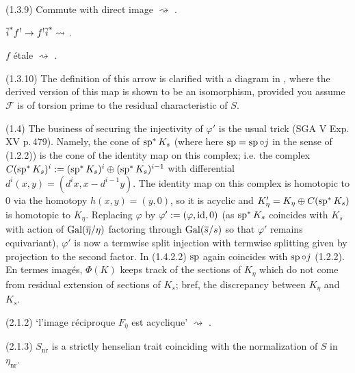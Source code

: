 \documentclass[deligne.tex]{subfiles}
\begin{document}
(1.3.9) Commute with direct image $\rightsquigarrow$
\cite[Exp. XVIII 3.1.12.3]{SGAA}.

$\overline i^*f^!\rightarrow f^!\overline i^*\rightsquigarrow$
\cite[Exp. XVIII 3.1.14.2]{SGAA}.

$f$ étale $\rightsquigarrow$ \cite[Exp. XVIII 3.1.8]{SGAA}.

(1.3.10) The definition of this arrow is clarified with a diagram in
\cite[3.7]{thfin}, where the derived version of this map is shown to be an
isomorphism, provided you assume $\mathcal F$ is of torsion prime to the
residual characteristic of $S$.

(1.4) The business of securing the injectivity of $\varphi'$ is the usual 
trick (SGA V Exp. XV p.\,479). Namely, the cone of $\operatorname{sp}^*K_s$
(where here $\operatorname{sp}=\operatorname{sp}\circ j$ in the sense of (1.2.2))
is the cone of the identity map on this complex; i.e. the complex
$C(\operatorname{sp}^*K_s)^i:=(\operatorname{sp}^*K_s)^i\oplus(\operatorname{sp}^*K_s)^{i-1}$ with differential
$d^i(x,y)=(d^ix,x-d^{i-1}y)$. The identity map on this complex is homotopic
to 0 via the homotopy $h(x,y)=(y,0)$, so it is acyclic and
$K'_\eta=K_\eta\oplus C(\operatorname{sp}^*K_s)$ is homotopic to $K_\eta$.
Replacing $\varphi$ by $\varphi':=(\varphi,\operatorname{id},0)$
(as $\operatorname{sp}^*K_s$ coincides with $K_{\overline s}$ with action of
$\operatorname{Gal}(\overline\eta/\eta)$ factoring through $\operatorname{Gal}(\overline s/s)$ so that
$\varphi'$ remains equivariant), $\varphi'$ is now a termwise split 
injection with termwise splitting given by projection to the second factor.
In (1.4.2.2) $\operatorname{sp}$ again coincides with $\operatorname{sp}\circ j$ (1.2.2).
En termes imagés, $\Phi(K)$ keeps track of the sections of $K_\eta$ which 
do not come from residual extension of sections of $K_s$; bref, the
discrepancy between $K_\eta$ and $K_s$.

(2.1.2) `l'image réciproque $F_{\overline\eta}$ est acyclique'
$\rightsquigarrow$ \cite[VII 5.7]{SGAA}.

(2.1.3) $S_{\mathrm{nr}}$ is a strictly henselian trait 
coinciding with the normalization of $S$ in $\eta_{\mathrm{nr}}$.
\end{document}
